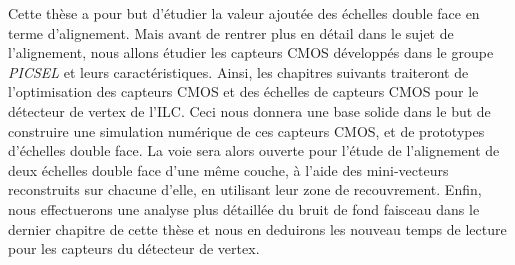   Cette th\`ese a pour but d'\'etudier la valeur ajout\'ee des \'echelles double face en terme d'alignement. Mais avant de rentrer plus en d\'etail dans le sujet de l'alignement, nous allons \'etudier les capteurs CMOS d\'evelopp\'es dans le groupe \textit{PICSEL} et leurs caract\'eristiques. Ainsi, les chapitres suivants traiteront de l'optimisation des capteurs CMOS et des \'echelles de capteurs CMOS pour le d\'etecteur de vertex de l'ILC. Ceci nous donnera une base solide dans le but de construire une simulation num\'erique de ces capteurs CMOS, et de prototypes d'\'echelles double face. La voie sera alors ouverte pour l'\'etude de l'alignement de deux \'echelles double face d'une m\^eme couche, \`a l'aide des mini-vecteurs reconstruits sur chacune d'elle, en utilisant leur zone de recouvrement. Enfin, nous effectuerons une analyse plus d\'etaill\'ee du bruit de fond faisceau dans le dernier chapitre de cette th\`ese et nous en deduirons les nouveau temps de lecture pour les capteurs du d\'etecteur de vertex.
  
  

  


